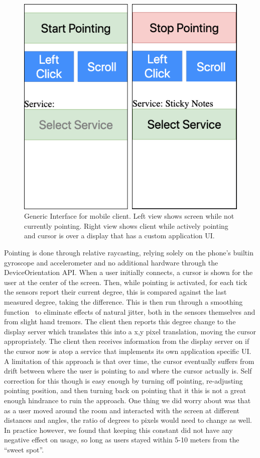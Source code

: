 \begin{figure}
\centering
  \includegraphics[width=0.65\columnwidth]{figures/generic_mobile_client}
  \caption{Generic Interface for mobile client. Left view shows
  screen while not currently pointing. Right view shows client
  while actively pointing and cursor is over a display that has a custom application UI.}
  \label{fig:mobile_start_ui}
\end{figure}

Pointing is done through relative raycasting, relying solely
on the phone's builtin gyroscope and accelerometer and no additional
hardware through the DeviceOrientation API. When a user initially
connects, a
cursor is shown for the user at the center of the screen. Then,
while pointing is activated, for each tick the sensors report
their current degree, this is compared against the last measured
degree, taking the difference. This is then run through a smoothing
function~\cite{casiez_1_2012} to eliminate effects of natural
jitter, both in the sensors themselves and from slight hand
tremors. The client then reports this degree change to the display
server which translates this into a x,y pixel translation,
moving the cursor appropriately. The client then receives
information from the display server on if the cursor now is atop
a service that implements its own application specific UI. A
limitation of this approach is that over time, the cursor
eventually suffers from drift between where the user is pointing
to and where the cursor actually is. Self correction for this
though is easy enough by turning off pointing, re-adjusting
pointing position, and then turning back on pointing that it
this is not a great enough hindrance to ruin the approach. One thing
we did worry about was that as a user moved around the room and
interacted with the screen at different distances and angles, the
ratio of
degrees to pixels would need to change as well. In practice however,
we found that keeping this constant did not have any negative
effect on usage, so long as users stayed within 5-10 meters from
the ``sweet spot''.

